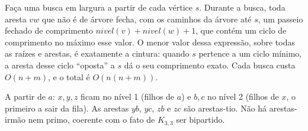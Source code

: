  Faça uma busca em largura a partir de cada vértice $s$. Durante a busca, toda aresta $vw$ que não é de árvore fecha, com os caminhos da árvore até $s$, um passeio fechado de comprimento $nivel(v)+nivel(w)+1$, que contém um ciclo de comprimento no máximo esse valor. O menor valor dessa expressão, sobre todas as raízes e arestas, é exatamente a cintura: quando $s$ pertence a um ciclo mínimo, a aresta desse ciclo ``oposta'' a $s$ dá o seu comprimento exato. Cada busca custa $O(n+m)$, e o total é $O(n(n+m))$.

 A partir de $a$: $x,y,z$ ficam no nível 1 (filhos de $a$) e $b,c$ no nível 2 (filhos de $x$, o primeiro a sair da fila). As arestas $yb$, $yc$, $zb$ e $zc$ são arestas-tio. Não há arestas-irmão nem primo, coerente com o fato de $K_{3,3}$ ser bipartido.

